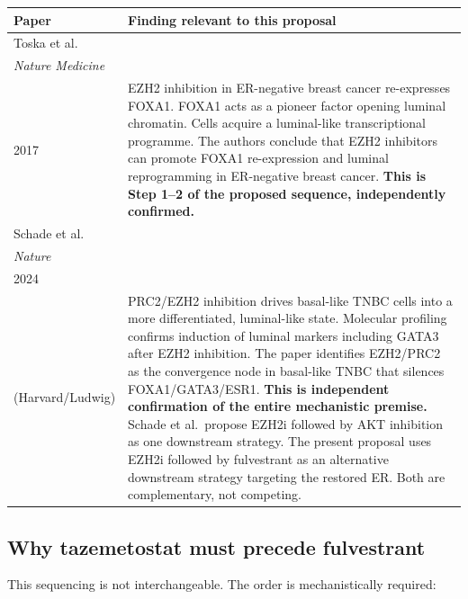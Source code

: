 \documentclass[12pt, a4paper]{article}
\begin{document}
\begin{center}
\begin{tabular}{p{3.5cm}p{9.5cm}}
\toprule
\textbf{Paper} & \textbf{Finding relevant to this proposal} \\
\midrule
Toska et al.\\
\textit{Nature Medicine}\\
2017
&
EZH2 inhibition in ER-negative breast cancer
re-expresses FOXA1. FOXA1 acts as a pioneer factor
opening luminal chromatin. Cells acquire a luminal-like
transcriptional programme. The authors conclude that
EZH2 inhibitors can promote FOXA1 re-expression and
luminal reprogramming in ER-negative breast cancer.
\textbf{This is Step 1--2 of the proposed sequence,
independently confirmed.}
\\[0.5em]
Schade et al.\\
\textit{Nature}\\
2024\\
(Harvard/Ludwig)
&
PRC2/EZH2 inhibition drives basal-like TNBC cells into
a more differentiated, luminal-like state. Molecular
profiling confirms induction of luminal markers
including GATA3 after EZH2 inhibition. The paper
identifies EZH2/PRC2 as the convergence node in
basal-like TNBC that silences FOXA1/GATA3/ESR1.
\textbf{This is independent confirmation of the
entire mechanistic premise.}
Schade et al.\ propose EZH2i followed by AKT inhibition
as one downstream strategy. The present proposal uses
EZH2i followed by fulvestrant as an alternative
downstream strategy targeting the restored ER.
Both are complementary, not competing.
\\
\bottomrule
\end{tabular}
\end{center}

\subsection{Why tazemetostat must precede fulvestrant}

This sequencing is not interchangeable. The order is
mechanistically required:
\end{document}
